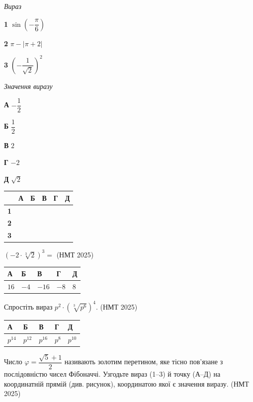 \documentclass[14pt]{extarticle}
\newcommand{\answerTable}[5]{
\begin{center}
\begin{tabular}{|*{5}{>{\centering\arraybackslash}m{2.8cm}|}}
\hline
\rule[-0.3cm]{0pt}{0.8cm}\textbf{А} & \textbf{Б} & \textbf{В} & \textbf{Г} & \textbf{Д} \\
\hline
\rule[-0.4cm]{0pt}{1.0cm}#1 & \rule[-0.4cm]{0pt}{1.0cm}#2 & \rule[-0.4cm]{0pt}{1.0cm}#3 & \rule[-0.4cm]{0pt}{1.0cm}#4 & \rule[-0.4cm]{0pt}{1.0cm}#5 \\
\hline
\end{tabular}
\end{center}
}
\newcommand{\matchTable}{
\begin{tabular}{|>{\centering\arraybackslash}p{0.3cm}|*{5}{>{\centering\arraybackslash}p{0.3cm}|}}
\hline
& \textbf{А} & \textbf{Б} & \textbf{В} & \textbf{Г} & \textbf{Д} \\
\hline
\textbf{1} & \rule{0pt}{0.3cm} & & & & \\
\hline
\textbf{2} & \rule{0pt}{0.3cm} & & & & \\
\hline
\textbf{3} & \rule{0pt}{0.3cm} & & & & \\
\hline
\end{tabular}
}
\newcommand{\task}[2]{\noindent\makebox[1.5em][l]{\textbf{#1.}}\parbox[t]{\dimexpr\textwidth-1.5em}{#2}}
\newcommand{\nmtyear}[1]{\hfill{\small\color{yearcolor}(НМТ #1)}}
\begin{document}
\vspace{0.3cm}
\begin{minipage}{0.35\textwidth}
\textit{Вираз}

\vspace{0.3cm}
\textbf{1} \quad $\sin\left(-\dfrac{\pi}{6}\right)$

\vspace{0.3cm}
\textbf{2} \quad $\pi - |\pi + 2|$

\vspace{0.4cm}
\textbf{3} \quad $\left(-\dfrac{1}{\sqrt{2}}\right)^2$
\end{minipage}
\hfill
\begin{minipage}{0.3\textwidth}
\textit{Значення виразу}

\vspace{0.3cm}
\textbf{А} \quad $-\dfrac{1}{2}$

\vspace{0.3cm}
\textbf{Б} \quad $\dfrac{1}{2}$

\vspace{0.2cm}
\textbf{В} \quad $2$

\vspace{0.2cm}
\textbf{Г} \quad $-2$

\vspace{0.2cm}
\textbf{Д} \quad $\sqrt{2}$
\end{minipage}
\hfill
\begin{minipage}{0.2\textwidth}
\matchTable
\end{minipage}

\vspace{0.7cm}

\task{41}{$\left(-2 \cdot \sqrt[3]{2}\right)^3 =$ \nmtyear{2025}}
\answerTable{$16$}{$-4$}{$-16$}{$-8$}{$8$}

\vspace{0.5cm}

\task{42}{Спростіть вираз $p^2 \cdot \left(\sqrt[3]{p^6}\right)^4$. \nmtyear{2025}}
\answerTable{$p^{14}$}{$p^{12}$}{$p^{16}$}{$p^{8}$}{$p^{10}$}

\vspace{0.5cm}

\task{43}{Число $\varphi = \dfrac{\sqrt{5} + 1}{2}$ називають золотим перетином, яке тісно пов'язане з послідовністю чисел Фібоначчі. Узгодьте вираз (1--3) й точку (А--Д) на координатній прямій (див. рисунок), координатою якої є значення виразу. \nmtyear{2025}}
\end{document}
